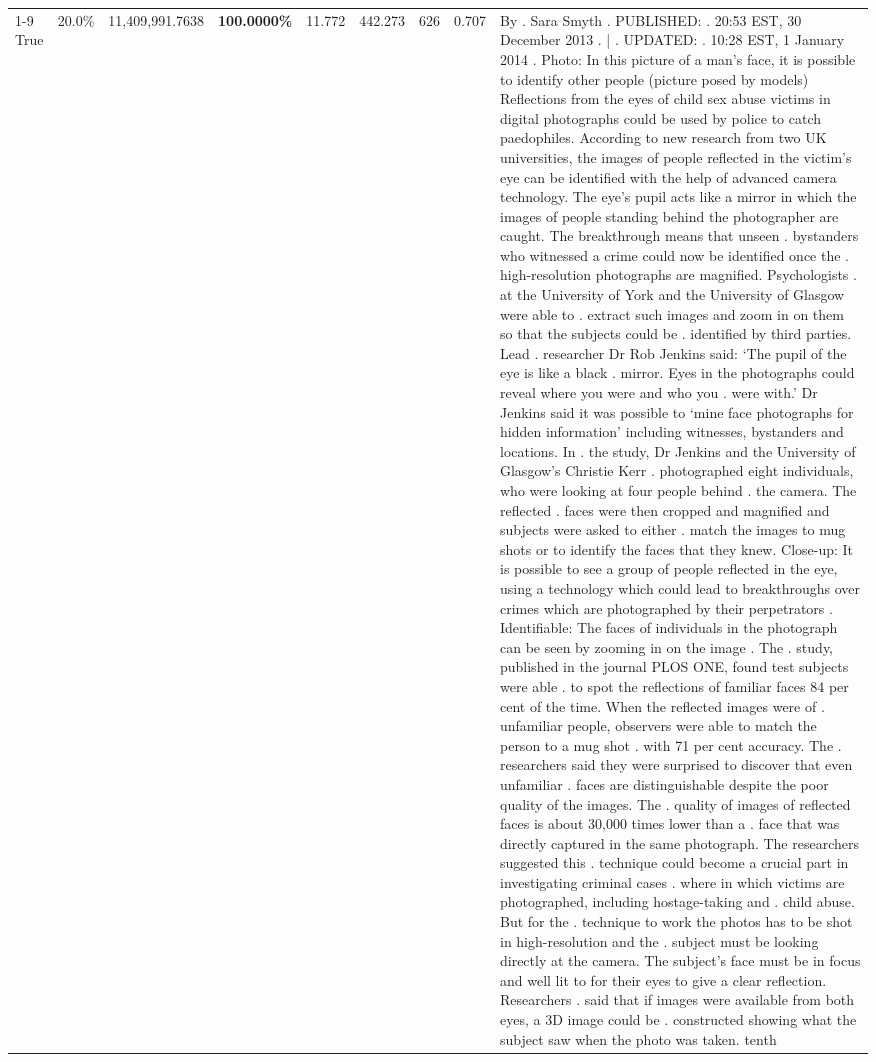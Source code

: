 \begin{table}[H]
\begin{tabular}{lllrlllll}
\cline{1-9}
True & 20.0\% & 11,409,991.7638 & \bfseries \color{red} 100.0000\% & 11.772 & 442.273 & 626 & 0.707 & By . Sara Smyth . PUBLISHED: . 20:53 EST, 30 December 2013 . | . UPDATED: . 10:28 EST, 1 January 2014 . Photo: In this picture of a man's face, it is possible to identify other people (picture posed by models) Reflections from the eyes of child sex abuse victims in digital photographs could be used by police to catch paedophiles. According to new research from two UK universities, the images of people reflected in the victim's eye can be identified with the help of advanced camera technology. The eye's pupil acts like a mirror in which the images of people standing behind the photographer are caught. The breakthrough means that unseen . bystanders who witnessed a crime could now be identified once the . high-resolution photographs are magnified. Psychologists . at the University of York and the University of Glasgow were able to . extract such images and zoom in on them so that the subjects could be . identified by third parties. Lead . researcher Dr Rob Jenkins said: ‘The pupil of the eye is like a black . mirror. Eyes in the photographs could reveal where you were and who you . were with.' Dr Jenkins said it was possible to ‘mine face photographs for hidden information' including witnesses, bystanders and locations. In . the study, Dr Jenkins and the University of Glasgow's Christie Kerr . photographed eight individuals, who were looking at four people behind . the camera. The reflected . faces were then cropped and magnified and subjects were asked to either . match the images to mug shots or to identify the faces that they knew. Close-up: It is possible to see a group of people reflected in the eye, using a technology which could lead to breakthroughs over crimes which are photographed by their perpetrators . Identifiable: The faces of individuals in the photograph can be seen by zooming in on the image . The . study, published in the journal PLOS ONE, found test subjects were able . to spot the reflections of familiar faces 84 per cent of the time. When the reflected images were of . unfamiliar people, observers were able to match the person to a mug shot . with 71 per cent accuracy. The . researchers said they were surprised to discover that even unfamiliar . faces are distinguishable despite the poor quality of the images. The . quality of images of reflected faces is about 30,000 times lower than a . face that was directly captured in the same photograph. The researchers suggested this . technique could become a crucial part in investigating criminal cases . where in which victims are photographed, including hostage-taking and . child abuse. But for the . technique to work the photos has to be shot in high-resolution and the . subject must be looking directly at the camera. The subject's face must be in focus and well lit to for their eyes to give a clear reflection. Researchers . said that if images were available from both eyes, a 3D image could be . constructed showing what the subject saw when the photo was taken. tenth \\

\end{tabular}
\end{table}
